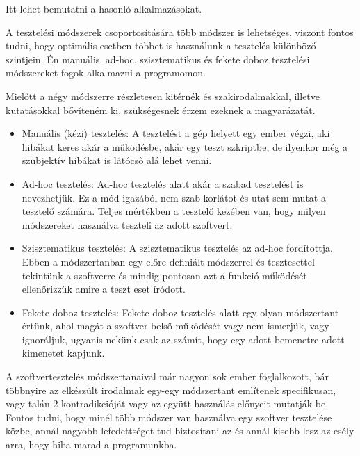 
Itt lehet bemutatni a hasonló alkalmazásokat.

A tesztelési módszerek csoportosítására több módszer is lehetséges, viszont fontos tudni, hogy optimális esetben többet is használunk a tesztelés különböző szintjein. Én manuális, ad-hoc, szisztematikus és fekete doboz tesztelési módszereket fogok alkalmazni a programomon.


Mielőtt a négy módszerre részletesen kitérnék és szakirodalmakkal, illetve kutatásokkal bővíteném ki, szükségesnek érzem ezeknek a magyarázatát.
\begin{itemize}

\item Manuális (kézi) tesztelés: A tesztelést a gép helyett egy ember végzi, aki  hibákat keres akár a működésbe, akár egy teszt szkriptbe, de ilyenkor még a szubjektív hibákat is látócső alá lehet venni.

\item Ad-hoc tesztelés: Ad-hoc tesztelés alatt akár a szabad tesztelést is nevezhetjük. Ez a mód igazából nem szab korlátot és utat sem mutat a tesztelő számára. Teljes mértékben a tesztelő kezében van, hogy milyen módszereket használva teszteli az adott szoftvert.

\item Szisztematikus tesztelés: A szisztematikus tesztelés az ad-hoc fordítottja. Ebben a módszertanban egy előre definiált módszerrel és tesztesettel tekintünk a szoftverre és mindig pontosan azt a funkció működését ellenőrizzük amire a teszt eset íródott.

\item Fekete doboz tesztelés: Fekete doboz tesztelés alatt egy olyan módszertant értünk, ahol magát a szoftver belső működését vagy nem ismerjük, vagy ignoráljuk, ugyanis nekünk csak az számít, hogy egy adott bemenetre adott kimenetet kapjunk.
\end{itemize}

A szoftvertesztelés módszertanaival már nagyon sok ember foglalkozott, bár többnyire az elkészült irodalmak egy-egy módszertant említenek specifikusan, vagy talán 2 kontradikcióját vagy az együtt használás előnyeit mutatják be. Fontos tudni, hogy minél több módszer van használva egy szoftver tesztelése közbe, annál nagyobb lefedettséget tud biztosítani az és annál kisebb lesz az esély arra, hogy hiba marad a programunkba.


